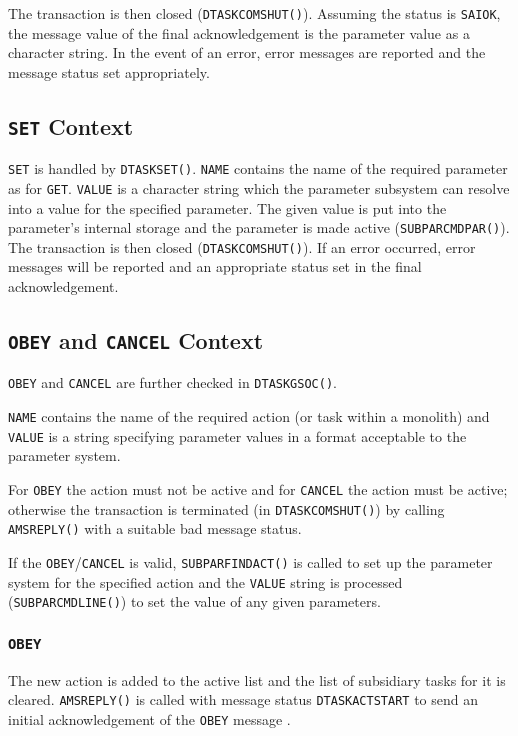 \documentclass[twoside,11pt]{article}
\newcommand{\htmlref}[2]{#1}
\renewcommand{\_}{\texttt{\symbol{95}}}
\begin{document}
The transaction is then closed (\texttt{DTASK\_COMSHUT()}). Assuming the
status is \texttt{SAI\_\_OK}, the message value of the final acknowledgement is
the parameter value as a character string.  In the event of an error, error
messages are reported and the message status set appropriately.

\subsection{\label{set_context}\texttt{SET} Context}
\texttt{SET} is handled by \texttt{DTASK\_SET()}. 
\texttt{NAME} contains the name of the required parameter as for
\htmlref{\texttt{GET}}{get_context}.
\texttt{VALUE} is a character string which the parameter subsystem can resolve
into a value for the specified parameter.
The given value is put into the parameter's internal storage and the parameter
is made active (\texttt{SUBPAR\_CMDPAR()}).
The transaction is then closed (\texttt{DTASK\_COMSHUT()}). If an error
occurred, error messages will be reported and an appropriate status set in
the final acknowledgement.

\subsection{\label{obey_and_cancel_context}
\texttt{OBEY} and \texttt{CANCEL} Context}
\texttt{OBEY} and \texttt{CANCEL} are further checked in
\texttt{DTASK\_GSOC()}.

\texttt{NAME} contains the name of the required action (or task within a
monolith) and \texttt{VALUE} is a string specifying parameter
values in a format acceptable to the parameter system.

For \texttt{OBEY} the action must not be active and for \texttt{CANCEL} the
action must be active; otherwise the transaction is terminated (in 
\texttt{DTASK\_COMSHUT()}) by calling \texttt{AMS\_REPLY()} with a suitable
bad message status.

If the \texttt{OBEY}/\texttt{CANCEL} is valid, \texttt{SUBPAR\_FINDACT()}
is called to set up the parameter system for the specified action and the
\texttt{VALUE} string is processed (\texttt{SUBPAR\_CMDLINE()}) to set the
value of any given parameters.

\subsubsection{\texttt{OBEY}}
The new action is added to the active list and the list of
subsidiary tasks for it is cleared. \texttt{AMS\_REPLY()} is called with
message status \texttt{DTASK\_\_ACTSTART} to send an initial acknowledgement
of the \texttt{OBEY} message .
\end{document}

